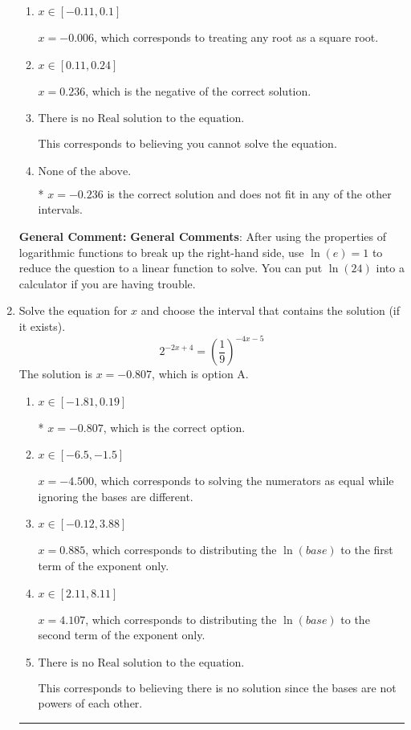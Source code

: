 \documentclass{extbook}[14pt]
\newcommand{\litem}[1]{\item #1

\rule{\textwidth}{0.4pt}}
\begin{document}
\begin{enumerate}
{\begin{enumerate}[label=\Alph*.]
$x = -2.597$, which corresponds to thinking you don't need to take the natural log of both sides before reducing, as if the right side already has a natural log.
\item \( x \in [-0.11, 0.1] \)

$x = -0.006$, which corresponds to treating any root as a square root.
\item \( x \in [0.11, 0.24] \)

$x = 0.236$, which is the negative of the correct solution.
\item \( \text{There is no Real solution to the equation.} \)

This corresponds to believing you cannot solve the equation.
\item \( \text{None of the above.} \)

* $x = -0.236$ is the correct solution and does not fit in any of the other intervals.
\end{enumerate}

\textbf{General Comment:} \textbf{General Comments}: After using the properties of logarithmic functions to break up the right-hand side, use $\ln(e) = 1$ to reduce the question to a linear function to solve. You can put $\ln(24)$ into a calculator if you are having trouble.
}
\litem{
Solve the equation for $x$ and choose the interval that contains the solution (if it exists).
\[ 2^{-2x+4} = \left(\frac{1}{9}\right)^{-4x-5} \]The solution is \( x = -0.807 \), which is option A.\begin{enumerate}[label=\Alph*.]
\item \( x \in [-1.81, 0.19] \)

* $x = -0.807$, which is the correct option.
\item \( x \in [-6.5, -1.5] \)

$x = -4.500$, which corresponds to solving the numerators as equal while ignoring the bases are different.
\item \( x \in [-0.12, 3.88] \)

$x = 0.885$, which corresponds to distributing the $\ln(base)$ to the first term of the exponent only.
\item \( x \in [2.11, 8.11] \)

$x = 4.107$, which corresponds to distributing the $\ln(base)$ to the second term of the exponent only.
\item \( \text{There is no Real solution to the equation.} \)

This corresponds to believing there is no solution since the bases are not powers of each other.
\end{enumerate}

}
\end{enumerate}
\end{document}
